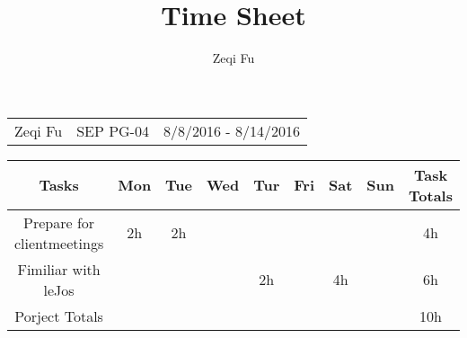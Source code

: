\documentclass[a4paper]{article}
\title{Time Sheet}
\author{Zeqi Fu}
\begin{document}
\maketitle

\begin{table}[h] 
\begin{tabular}{l c r}
Zeqi Fu & SEP PG-04 & 8/8/2016 - 8/14/2016    \\
\end{tabular}
\end{table}

\begin{table}[h]
\centering
\begin{tabular}{ccccccccc}\renewcommand{\arraystretch}{4}
Tasks & Mon & Tue & Wed & Tur & Fri & Sat & Sun & Task Totals \\\hline
Prepare for clientmeetings & 2h & 2h & & & & & & 4h \\
Fimiliar with leJos & & & & 2h & & 4h & & 6h\\\hline
Porject Totals & & & & & & & & 10h\\\hline

\end{tabular}
\end{table}
\end{document}
